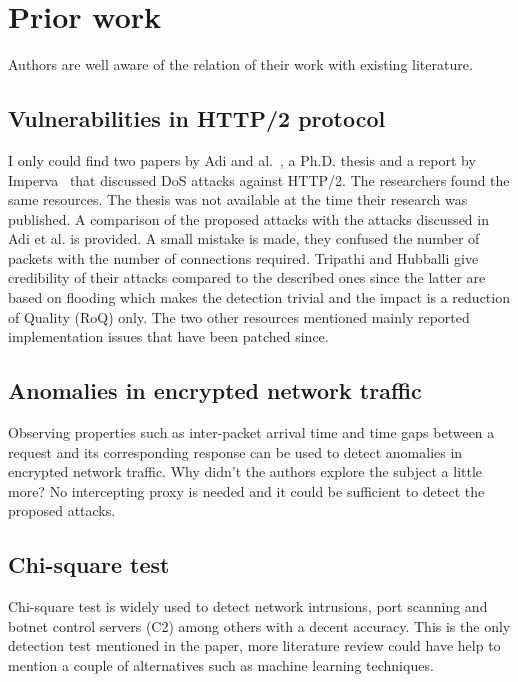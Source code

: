 \documentclass[11pt, a4paper]{article}
\begin{document}
\section{Prior work}

Authors are well aware of the relation of their work with existing literature.

\subsection{Vulnerabilities in HTTP/2 protocol}

I only could find two papers by Adi and al.~\cite{Adi:2015}\cite{Adi:2016}, a Ph.D. thesis \cite{Adi:2017} and a report by Imperva~\cite{Imperva:h2} that discussed DoS attacks against HTTP/2.
The researchers found the same resources.
The thesis was not available at the time their research was published.
A comparison of the proposed attacks with the attacks discussed in Adi et al. is provided.
A small mistake is made, they confused the number of packets with the number of connections required.
Tripathi and Hubballi give credibility of their attacks compared to the described ones since the latter are based on flooding which makes the detection trivial and the impact is a reduction of Quality (RoQ) only.
The two other resources mentioned mainly reported implementation issues that have been patched since.

\subsection{Anomalies in encrypted network traffic}

Observing properties such as inter-packet arrival time and time gaps between a request and its corresponding response can be used to detect anomalies in encrypted network traffic.
Why didn't the authors explore the subject a little more?
No intercepting proxy is needed and it could be sufficient to detect the proposed attacks.

\subsection{Chi-square test}

Chi-square test is widely used to detect network intrusions, port scanning and botnet control servers (C2) among others with a decent accuracy.
This is the only detection test mentioned in the paper, more literature review could have help to mention a couple of alternatives such as machine learning techniques.
\end{document}
